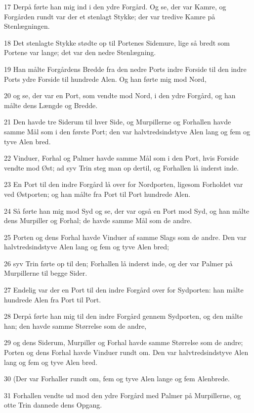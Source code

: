 \par 17 Derpå førte han mig ind i den ydre Forgård. Og se, der var Kamre, og Forgården rundt var der et stenlagt Stykke; der var tredive Kamre på Stenlægningen.
\par 18 Det stenlagte Stykke stødte op til Portenes Sidemure, lige så bredt som Portene var lange; det var den nedre Stenlægning.
\par 19 Han målte Forgårdens Bredde fra den nedre Ports indre Forside til den indre Ports ydre Forside til hundrede Alen. Og han førte mig mod Nord,
\par 20 og se, der var en Port, som vendte mod Nord, i den ydre Forgård, og han målte dens Længde og Bredde.
\par 21 Den havde tre Siderum til hver Side, og Murpillerne og Forhallen havde samme Mål som i den første Port; den var halvtredsindstyve Alen lang og fem og tyve Alen bred.
\par 22 Vinduer, Forhal og Palmer havde samme Mål som i den Port, hvis Forside vendte mod Øst; ad syv Trin steg man op dertil, og Forhallen lå inderst inde.
\par 23 En Port til den indre Forgård lå over for Nordporten, ligesom Forholdet var ved Østporten; og han målte fra Port til Port hundrede Alen.
\par 24 Så førte han mig mod Syd og se, der var også en Port mod Syd, og han målte dens Murpiller og Forhal; de havde samme Mål som de andre.
\par 25 Porten og dens Forhal havde Vinduer af samme Slags som de andre. Den var halvtredsindstyve Alen lang og fem og tyve Alen bred;
\par 26 syv Trin førte op til den; Forhallen lå inderst inde, og der var Palmer på Murpillerne til begge Sider.
\par 27 Endelig var der en Port til den indre Forgård over for Sydporten: han målte hundrede Alen fra Port til Port.
\par 28 Derpå førte han mig til den indre Forgård gennem Sydporten, og den målte han; den havde samme Størrelse som de andre,
\par 29 og dens Siderum, Murpiller og Forhal havde samme Størrelse som de andre; Porten og dens Forhal havde Vinduer rundt om. Den var halvtredsindstyve Alen lang og fem og tyve Alen bred.
\par 30 (Der var Forhaller rundt om, fem og tyve Alen lange og fem Alenbrede.
\par 31 Forhallen vendte ud mod den ydre Forgård med Palmer på Murpillerne, og otte Trin dannede dens Opgang.
